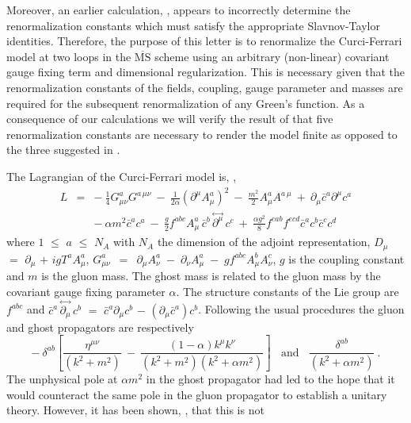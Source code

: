 \documentclass[a4paper,11pt]{article}
\newcommand{\MSbar}{\overline{\mbox{MS}}}
\begin{document}
Moreover, an earlier calculation, \cite{14}, appears to incorrectly determine 
the renormalization constants which must satisfy the appropriate Slavnov-Taylor
identities. Therefore, the purpose of this letter is to renormalize the 
Curci-Ferrari model at two loops in the $\MSbar$ scheme using an arbitrary 
(non-linear) covariant gauge fixing term and dimensional regularization. This 
is necessary given that the renormalization constants of the fields, coupling, 
gauge parameter and masses are required for the subsequent renormalization of 
any Green's function. As a consequence of our calculations we will verify the 
result of \cite{4} that five renormalization constants are necessary to render 
the model finite as opposed to the three suggested in \cite{3}. 

The Lagrangian of the Curci-Ferrari model is, \cite{1},  
\begin{eqnarray} 
L &=& -~ \frac{1}{4} G_{\mu\nu}^a G^{a \, \mu\nu} ~-~ \frac{1}{2\alpha} 
(\partial^\mu A^a_\mu)^2 ~-~ \frac{m^2}{2} A_\mu^a A^{a \, \mu} ~+~ 
\partial_\mu \bar{c}^a \partial^\mu c^a \nonumber \\ 
&& -~ \alpha m^2 \bar{c}^a c^a ~-~ \frac{g}{2} f^{abc} A^a_\mu \, \bar{c}^b \, 
{\stackrel \leftrightarrow {\partial^\mu} } \, c^c ~+~ \frac{\alpha g^2}{8} 
f^{eab} f^{ecd} \bar{c}^a c^b \bar{c}^c c^d 
\label{lag}
\end{eqnarray}  
where $1$ $\leq$ $a$ $\leq$ $N_{\! A}$ with $N_{\! A}$ the dimension of the
adjoint representation, $D_\mu$ $=$ $\partial_\mu$ $+$ $ig T^a A^a_\mu$, 
$G^a_{\mu\nu}$~$=$~$\partial_\mu A^a_\nu$~$-$~$\partial_\nu A^a_\mu$~$-$~$g 
f^{abc} A^b_\mu A^c_\nu$, $g$ is the coupling constant and $m$ is the gluon 
mass. The ghost mass is related to the gluon mass by the covariant gauge fixing
parameter $\alpha$. The structure constants of the Lie group are $f^{abc}$ and 
$\bar{c}^a \, {\stackrel \leftrightarrow {\partial_\mu} } \, c^b$ $=$ 
$\bar{c}^a \partial_\mu c^b$ $-$ $(\partial_\mu \bar{c}^a) c^b$. Following the 
usual procedures the gluon and ghost propagators are respectively  
\begin{equation}
-~ \delta^{ab} \left[ \frac{\eta^{\mu\nu}}{(k^2+m^2)} ~-~ \frac{(1-\alpha)k^\mu
k^\nu}{(k^2+m^2)(k^2+\alpha m^2)} \right] ~~~~ \mbox{and} ~~~~ 
\frac{\delta^{ab}}{(k^2+\alpha m^2)} ~.  
\label{propdefn} 
\end{equation} 
The unphysical pole at $\alpha m^2$ in the ghost propagator had led to the hope
that it would counteract the same pole in the gluon propagator to establish a 
unitary theory. However, it has been shown, \cite{1,2,3,4}, that this is not
\end{document}
